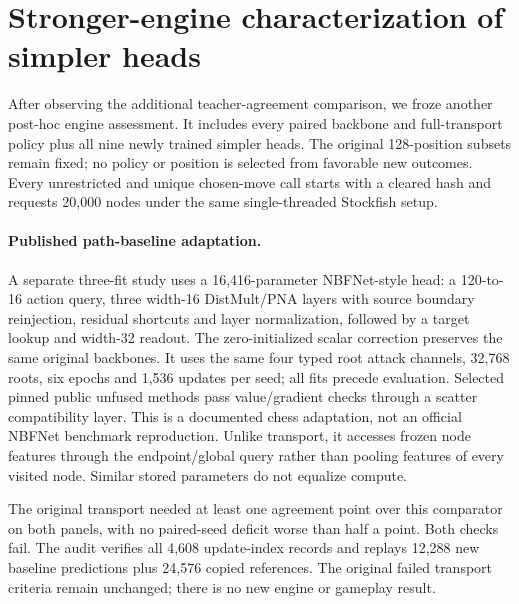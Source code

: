 \section{Stronger-engine characterization of simpler heads}
\label{app:baseline-engine}
After observing the additional teacher-agreement comparison, we froze another
post-hoc engine assessment. It includes every paired backbone and full-transport
policy plus all nine newly trained simpler heads. The original 128-position
subsets remain fixed; no policy or position is selected from favorable new
outcomes. Every unrestricted and unique chosen-move call starts with a cleared
hash and requests 20,000 nodes under the same single-threaded Stockfish setup.



\BaselineEngineResults{}

\paragraph{Published path-baseline adaptation.}
A separate three-fit study uses a 16,416-parameter NBFNet-style head: a
120-to-16 action query, three width-16 DistMult/PNA layers with source boundary
reinjection, residual shortcuts and layer normalization, followed by a target
lookup and width-32 readout. The zero-initialized scalar correction preserves
the same original backbones. It uses the same four typed root attack channels,
32,768 roots, six epochs and 1,536 updates per seed; all fits precede evaluation.
Selected pinned public unfused methods pass value/gradient checks through a
scatter compatibility layer. This is a documented chess adaptation, not an
official NBFNet benchmark reproduction. Unlike transport, it accesses frozen
node features through the endpoint/global query rather than pooling features
of every visited node. Similar stored parameters do not equalize compute.


The original transport needed at least one agreement point over this comparator
on both panels, with no paired-seed deficit worse than half a point. Both checks
fail. The audit verifies all 4,608 update-index records and replays 12,288 new
baseline predictions plus 24,576 copied references. The original failed
transport criteria remain unchanged; there is no new engine or gameplay result.
\PathBaselineLatency{}

